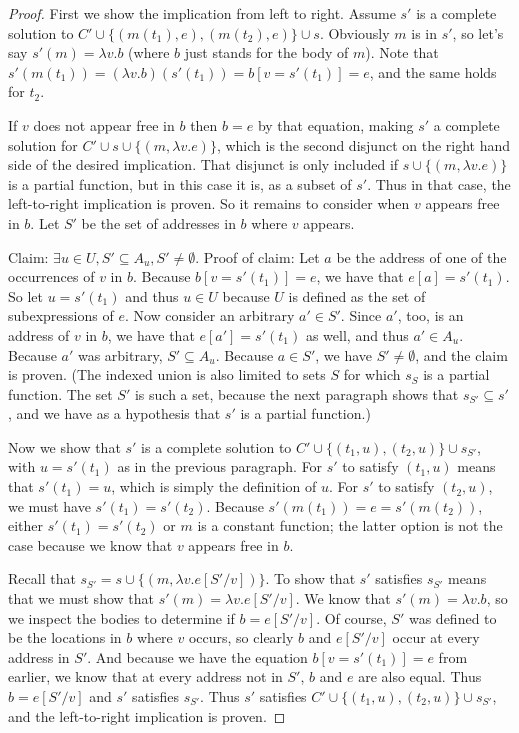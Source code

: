 \documentclass{article}
\begin{document}
\begin{proof}
First we show the implication from left to right.  Assume $s'$ is a complete solution to $C'\cup\{(m(t_1),e),(m(t_2),e)\}\cup s$.  Obviously $m$ is in $s'$, so let's say $s'(m)=\lambda v.b$ (where $b$ just stands for the body of $m$).  Note that $s'(m(t_1))=(\lambda v.b)(s'(t_1))=b[v=s'(t_1)]=e$, and the same holds for $t_2$.

If $v$ does not appear free in $b$ then $b=e$ by that equation, making $s'$ a complete solution for $C'\cup s\cup\{(m,\lambda v.e)\}$, which is the second disjunct on the right hand side of the desired implication.  That disjunct is only included if $s\cup\{(m,\lambda v.e)\}$ is a partial function, but in this case it is, as a subset of $s'$.  Thus in that case, the left-to-right implication is proven.  So it remains to consider when $v$ appears free in $b$.  Let $S'$ be the set of addresses in $b$ where $v$ appears.

Claim: $\exists u\in U, S'\subseteq A_u,S'\neq\emptyset$.  Proof of claim:  Let $a$ be the address of one of the occurrences of $v$ in $b$.  Because $b[v=s'(t_1)]=e$, we have that $e[a]=s'(t_1)$.  So let $u=s'(t_1)$ and thus $u\in U$ because $U$ is defined as the set of subexpressions of $e$.  Now consider an arbitrary $a'\in S'$.  Since $a'$, too, is an address of $v$ in $b$, we have that $e[a']=s'(t_1)$ as well, and thus $a'\in A_u$.  Because $a'$ was arbitrary, $S'\subseteq A_u$.  Because $a\in S'$, we have $S'\neq\emptyset$, and the claim is proven.  (The indexed union is also limited to sets $S$ for which $s_S$ is a partial function.  The set $S'$ is such a set, because the next paragraph shows that $s_{S'}\subseteq s'$, and we have as a hypothesis that $s'$ is a partial function.)

Now we show that $s'$ is a complete solution to $C'\cup\{(t_1,u),(t_2,u)\}\cup s_{S'}$, with $u=s'(t_1)$ as in the previous paragraph.  For $s'$ to satisfy $(t_1,u)$ means that $s'(t_1)=u$, which is simply the definition of $u$.  For $s'$ to satisfy $(t_2,u)$, we must have $s'(t_1)=s'(t_2)$.  Because $s'(m(t_1))=e=s'(m(t_2))$, either $s'(t_1)=s'(t_2)$ or $m$ is a constant function; the latter option is not the case because we know that $v$ appears free in $b$.

Recall that $s_{S'}=s\cup\{(m,\lambda v.e[S'/v])\}$.  To show that $s'$ satisfies $s_{S'}$ means that we must show that $s'(m)=\lambda v.e[S'/v]$.  We know that $s'(m)=\lambda v.b$, so we inspect the bodies to determine if $b=e[S'/v]$.  Of course, $S'$ was defined to be the locations in $b$ where $v$ occurs, so clearly $b$ and $e[S'/v]$ occur at every address in $S'$.  And because we have the equation $b[v=s'(t_1)]=e$ from earlier, we know that at every address not in $S'$, $b$ and $e$ are also equal.  Thus $b=e[S'/v]$ and $s'$ satisfies $s_{S'}$.  Thus $s'$ satisfies $C'\cup\{(t_1,u),(t_2,u)\}\cup s_{S'}$, and the left-to-right implication is proven.


\end{proof}
\end{document}
